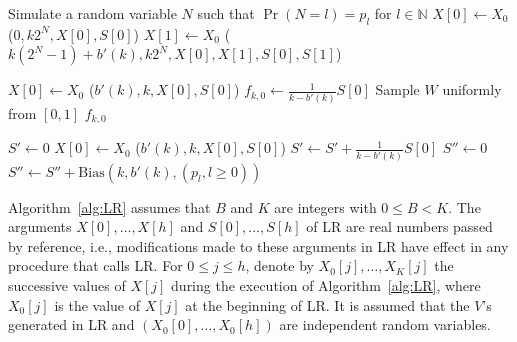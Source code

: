 \documentclass[a4paper,11pt]{article}
\begin{document}
\begin{algorithm}[H]
\caption{Procedure Bias}
\label{alg:Bias}
\begin{algorithmic}[1]
\State Simulate a random variable \(N\) such that \(\Pr(N=l)=p_{l}\) for \(l\in\mathbb{N}\)
\State \(X[0]\gets X_{0}\)
($0,k2^{N},X[0],S[0]$)
\State \(X[1]\gets X_{0}\)
(\(k(2^{N}-1)+b'(k),k2^{N},X[0],X[1],S[0],S[1]\))
\State {} 
\EndProcedure
\end{algorithmic}
\end{algorithm}

\begin{algorithm}[H]
\caption{Procedure UnbiasedLongRun}
\label{alg:RHAlk}
\begin{algorithmic}[1]
\State \(X[0]\gets X_{0}\)
($b'(k),k,X[0],S[0]$)
\State $f_{k,0}\gets\frac{1}{k-b'(k)}S[0]$
\State Sample \(W\) uniformly from \([0,1]\)
\State \Return $f_{k,0}$
\Else
\State {} \EndIf
\EndProcedure
\end{algorithmic}
\end{algorithm}

\begin{algorithm}[H]
\caption{Procedure StratifiedUnbiasedLongRun}
\label{alg:SULR}
\begin{algorithmic}[1]
\State $S'\gets0$
\State \(X[0]\gets X_{0}\)
($b'(k),k,X[0],S[0]$)
\State $S'\gets S'+\frac{1}{k-b'(k)}S[0]$
\EndFor
\State $S''\gets0$
\State $S''\gets S''+{\text{Bias}}(k,b'(k),(p_{l},l\geq0))$
\EndFor
\State {} 
\EndProcedure
\end{algorithmic}
\end{algorithm}
Algorithm~\ref{alg:LR} assumes that \(B\) and \(K\) are integers with \(0\leq B<K\). The arguments \(X[0],\dots,X[h]\) and \(S[0],\dots,S[h]\) of LR are real numbers passed by reference, i.e., modifications made to these arguments
in LR have effect in any procedure that calls LR. For \(0\leq j\leq h\), denote by \(X_{0}[j],\dots,X_{K}[j]\) the successive values of \(X[j]\) during the execution of Algorithm~\ref{alg:LR}, where   \(X_{0}[j]\) is the value of  \(X[j]\) at the beginning of LR. It is assumed that the \(V\)'s generated in LR and  \((X_{0}[0],\dots,X_{0}[h])\) are independent random variables.
\end{document}
